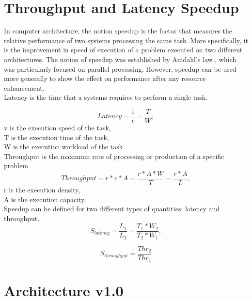 \section{Throughput and Latency Speedup}
 In computer architecture, the notion speedup is the factor that measures the relative performance of two systems processing the same task. More specifically, it is the improvement in speed of execution of a problem executed on two different architectures. The notion of speedup was established by Amdahl's law \cite{Reference74}, which was particularly focused on parallel processing. However, speedup can be used more generally to show the effect on performance after any resource enhancement. \\
 

 Latency is the time that a systems requires to perform a single task.
     
  \begin{equation}\label{eq:Latency}
  Latency= \frac{1}{v} = \frac{T}{W},
  \end{equation}
  v is the execution speed of the task, \\
  T is the execution time of the task, \\
  W is the execution workload of the task\\
  
Throughput is the maximum rate of processing or production of a specific problem.
  \begin{equation}\label{eq:Throughput}
  Throughput= r*v*A = \frac{r*A*W}{T} = \frac{r*A}{L},
  \end{equation} 
  r is the execution density, \\
  A is the execution capacity, \\
 

Speedup can be defined for two different types of quantities: latency and throughput.
\begin{equation}\label{eq:Latency}
  S_{latency}= \frac{L_{1}}{L_{2}} = \frac{T_{1}*W_{2}}{T_{2}*W_{1}},
  \end{equation} 
  
\begin{equation}\label{eq:Sp_Throughput}
  S_{throughput}= \frac{Thr_{2}}{Thr_{1}} 
   \end{equation} 


\section{Architecture v1.0}

